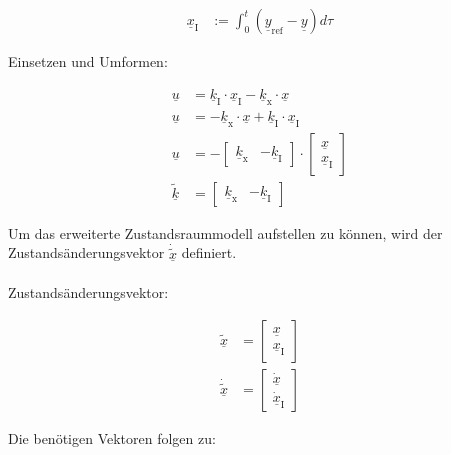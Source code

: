 \begin{align}\label{eq:Gleichung60}
    \underline{x}_{\mathrm{I}}& :=\int_{0}^t(\underline{y}_{\mathrm{ref}}-\underline{y})d\tau
\end{align}

Einsetzen und Umformen:

\begin{align}
    \underline{u} &= \underline{k}_{\mathrm{I}}\cdot\underline{x}_{\mathrm{I}}-\underline{k}_{\mathrm{x}}\cdot\underline{x} \nonumber \\
    \underline{u} &= -\underline{k}_{\mathrm{x}}\cdot\underline{x}+\underline{k}_{\mathrm{I}}\cdot\underline{x}_{\mathrm{I}} \nonumber\\
    \underline{u} &= -
    \begin{bmatrix}
        \underline{k}_{\mathrm{x}} & -\underline{k}_{\mathrm{I}}
    \end{bmatrix}
    \cdot
    \begin{bmatrix}
        \underline{x} \\
        \underline{x}_{\mathrm{I}}
    \end{bmatrix} \label{eq:Gleichung61} \\
    \underline{\tilde{k}} &= 
    \begin{bmatrix}
        \underline{k}_{\mathrm{x}} & -\underline{k}_{\mathrm{I}}
    \end{bmatrix} \label{eq:Gleichung62}
\end{align}

Um das erweiterte Zustandsraummodell aufstellen zu können, wird der Zustandsänderungsvektor $\underline{\dot{\tilde{x}}}$ definiert.\\\\
Zustandsänderungsvektor:

\begin{align}
    \underline{\tilde{x}} &=
    \begin{bmatrix}
        \underline{x} \\
        \underline{x}_{\mathrm{I}}
    \end{bmatrix} \nonumber \\
    \underline{\dot{\tilde{x}}} &= 
    \begin{bmatrix}
        \underline{\dot{x}} \\
        \underline{\dot{x}}_{\mathrm{I}}
    \end{bmatrix} \label{eq:Gleichung63}
\end{align}

Die benötigen Vektoren folgen zu:

